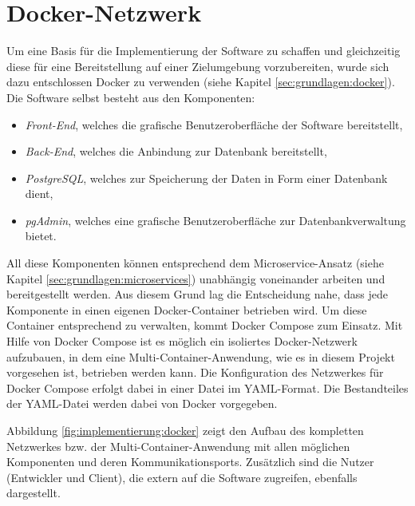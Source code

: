 \section{Docker-Netzwerk}

Um eine Basis für die Implementierung der Software zu schaffen und gleichzeitig diese für eine Bereitstellung auf einer Zielumgebung vorzubereiten, wurde sich dazu entschlossen Docker zu verwenden (siehe Kapitel \ref{sec:grundlagen:docker}). 
Die Software selbst besteht aus den Komponenten:
\begin{itemize}
	\item \emph{Front-End}, welches die grafische Benutzeroberfläche der Software bereitstellt,
	\item \emph{Back-End}, welches die Anbindung zur Datenbank bereitstellt,
	\item \emph{PostgreSQL}, welches zur Speicherung der Daten in Form einer Datenbank dient,
	\item \emph{pgAdmin}, welches eine grafische Benutzeroberfläche zur Datenbankverwaltung bietet.
\end{itemize}

All diese Komponenten können entsprechend dem Microservice-Ansatz (siehe Kapitel \ref{sec:grundlagen:microservices}) unabhängig voneinander arbeiten und bereitgestellt werden. 
Aus diesem Grund lag die Entscheidung nahe, dass jede Komponente in einen eigenen Docker-Container betrieben wird.
Um diese Container entsprechend zu verwalten, kommt Docker Compose zum Einsatz.
Mit Hilfe von Docker Compose ist es möglich ein isoliertes Docker-Netzwerk aufzubauen, in dem eine Multi-Container-Anwendung, wie es in diesem Projekt vorgesehen ist, betrieben werden kann.
Die Konfiguration des Netzwerkes für Docker Compose erfolgt dabei in einer Datei im YAML-Format. 
Die Bestandteiles der YAML-Datei werden dabei von Docker vorgegeben.

Abbildung \ref{fig:implementierung:docker} zeigt den Aufbau des kompletten Netzwerkes bzw. der Multi-Container-Anwendung mit allen möglichen Komponenten und deren Kommunikationsports. 
Zusätzlich sind die Nutzer (Entwickler und Client), die extern auf die Software zugreifen, ebenfalls dargestellt.

